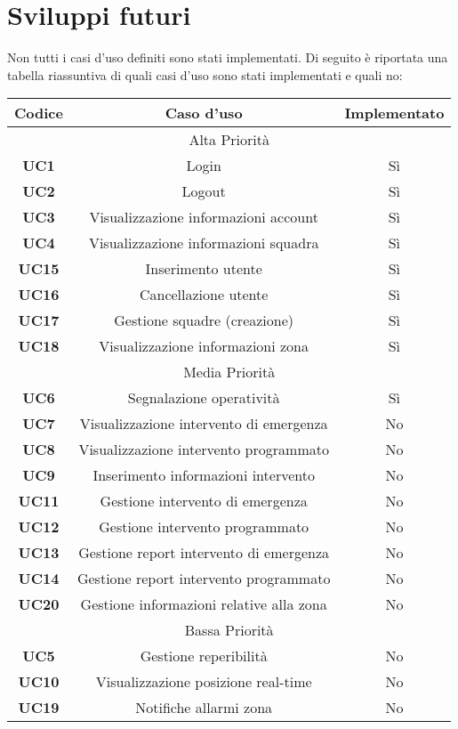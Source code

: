 
\section{Sviluppi futuri}
Non tutti i casi d'uso definiti sono stati implementati. Di seguito è riportata una tabella riassuntiva di quali casi d'uso sono stati implementati e quali no:

\begin{center}
	\begin{tabular}{|c|c|c|}
		\hline
		\textbf{Codice} & \textbf{Caso d'uso} & \textbf{Implementato} \\ \hline
		\multicolumn{3}{|c|}{Alta Priorità} \\ \hline
		\textbf{UC1} & Login & Sì\\ \hline
		\textbf{UC2} & Logout & Sì \\ \hline
		\textbf{UC3} & Visualizzazione informazioni account & Sì \\ \hline
		\textbf{UC4} & Visualizzazione informazioni squadra & Sì \\ \hline
		\textbf{UC15} & Inserimento utente & Sì \\ \hline
		\textbf{UC16} & Cancellazione utente & Sì\\ \hline
		\textbf{UC17} & Gestione squadre (creazione) & Sì \\ \hline
		\textbf{UC18} & Visualizzazione informazioni zona & Sì \\ \hline
		\multicolumn{3}{|c|}{Media Priorità} \\ \hline
		\textbf{UC6} & Segnalazione operatività & Sì\\ \hline
		\textbf{UC7} & Visualizzazione intervento di emergenza & No \\ \hline
		\textbf{UC8} & Visualizzazione intervento programmato & No \\ \hline
		\textbf{UC9} & Inserimento informazioni intervento & No \\ \hline
		\textbf{UC11} & Gestione intervento di emergenza & No \\ \hline
		\textbf{UC12} & Gestione intervento programmato & No \\ \hline
		\textbf{UC13} & Gestione report intervento di emergenza & No \\ \hline
		\textbf{UC14} & Gestione report intervento programmato & No \\ \hline
		\textbf{UC20} & Gestione informazioni relative alla zona & No \\ \hline
		\multicolumn{3}{|c|}{Bassa Priorità} \\ \hline
		\textbf{UC5} & Gestione reperibilità & No\\ \hline
		\textbf{UC10} & Visualizzazione posizione real-time & No\\ \hline
		\textbf{UC19} & Notifiche allarmi zona & No\\ \hline
	\end{tabular}
\end{center}
 